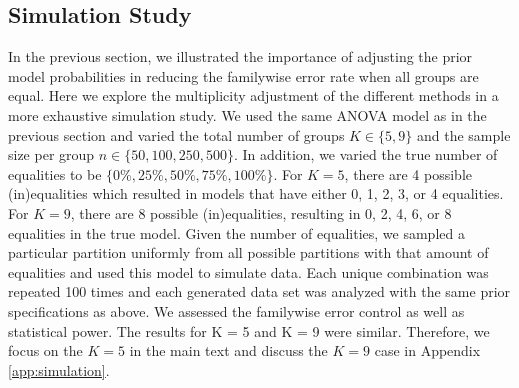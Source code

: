 \documentclass[11pt,a4paper]{article}
\theoremstyle{definition} %
\theoremstyle{case}
\begin{document}

\subsection{Simulation Study} \label{sec:simulation}
In the previous section, we illustrated the importance of adjusting the prior model probabilities in reducing the familywise error rate when all groups are equal. Here we explore the multiplicity adjustment of the different methods in a more exhaustive simulation study. We used the same ANOVA model as in the previous section and varied the total number of groups $K \in \{5, 9\}$ and the sample size per group $n \in \{50, 100, 250, 500\}$. In addition, we varied the true number of equalities to be $\{0\%, 25\%, 50\%, 75\%, 100\%\}$. For $K = 5$, there are 4 possible (in)equalities which resulted in models that have either 0, 1, 2, 3, or 4 equalities. For $K = 9$, there are 8 possible (in)equalities, resulting in 0, 2, 4, 6, or 8 equalities in the true model. Given the number of equalities, we sampled a particular partition uniformly from all possible partitions with that amount of equalities and used this model to simulate data. Each unique combination was repeated 100 times and each generated data set was analyzed with the same prior specifications as above. We assessed the familywise error control as well as statistical power. The results for K = 5 and K = 9 were similar. Therefore, we focus on the $K = 5$ in the main text and discuss the $K = 9$ case in Appendix \ref{app:simulation}.
\end{document}
